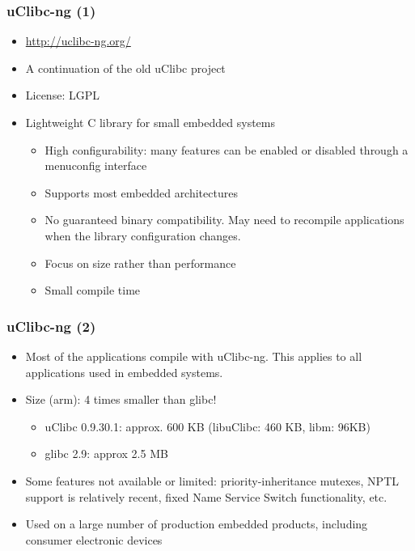 \begin{frame}
  \frametitle{uClibc-ng (1)}
  \begin{itemize}
  \item \url{http://uclibc-ng.org/}
  \item A continuation of the old uClibc project
  \item License: LGPL
  \item Lightweight C library for small embedded systems
    \begin{itemize}
    \item High configurability: many features can be enabled or
      disabled through a menuconfig interface
    \item Supports most embedded architectures
    \item No guaranteed binary compatibility. May need to
      recompile applications when the library configuration changes.
    \item Focus on size rather than performance
    \item Small compile time
    \end{itemize}
  \end{itemize}
\end{frame}

\begin{frame}
  \frametitle{uClibc-ng (2)}
  \begin{itemize}
  \item Most of the applications compile with uClibc-ng. This applies to
    all applications used in embedded systems.
  \item Size (arm): 4 times smaller than glibc!
    \begin{itemize}
    \item uClibc 0.9.30.1: approx. 600 KB (libuClibc: 460 KB, libm:
      96KB)
    \item glibc 2.9: approx 2.5 MB
    \end{itemize}
  \item Some features not available or limited: priority-inheritance
    mutexes, NPTL support is relatively recent, fixed Name Service Switch
    functionality, etc.
  \item Used on a large number of production embedded products,
    including consumer electronic devices
\end{itemize}
\end{frame}

